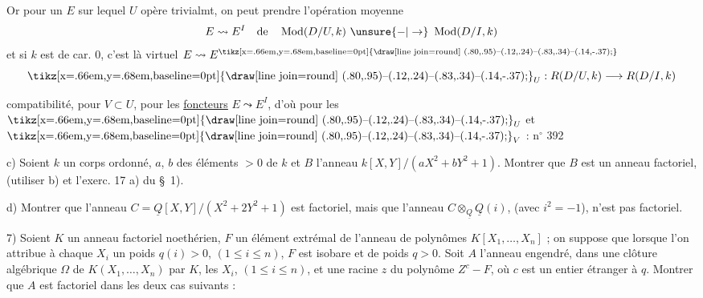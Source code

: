 Or pour un $E$ sur lequel $U$ opère trivialmt, on peut prendre l'opération moyenne
\[
 E\leadsto E^I \quad \text{de}\quad \operatorname{Mod}(D/U,k)\ \unsure{\mathord{-}|\to}\ \operatorname{Mod}(D/I,k)
\]
et si $k$ est de car. $0$, c'est là     virtuel  $E\leadsto E^{\mathord{\text{\tikz[x=.66em,y=.68em,baseline=0pt]{\draw[line join=round] (.80,.95)--(.12,.24)--(.83,.34)--(.14,-.37);}}}}$
\[
 \mathord{\text{\tikz[x=.66em,y=.68em,baseline=0pt]{\draw[line join=round] (.80,.95)--(.12,.24)--(.83,.34)--(.14,-.37);}}}_U:R(D/U,k)\longrightarrow R(D/I,k)
\]

  compatibilité, pour $V\subset U$, pour les \uline{foncteurs} $E\leadsto E^I$, d'où pour les $\mathord{\text{\tikz[x=.66em,y=.68em,baseline=0pt]{\draw[line join=round] (.80,.95)--(.12,.24)--(.83,.34)--(.14,-.37);}}}_U$ et $\mathord{\text{\tikz[x=.66em,y=.68em,baseline=0pt]{\draw[line join=round] (.80,.95)--(.12,.24)--(.83,.34)--(.14,-.37);}}}_V$ :
\hfill n$^{\circ}$ 392

c) Soient $k$ un corps ordonné, $a$, $b$ des éléments $>0$ de $k$ et $B$ l'anneau $k[X,Y]/(aX^2+bY^2+1)$. Montrer que $B$ est un anneau factoriel, (utiliser b) et l'exerc. 17 a) du \S~1).

d) Montrer que l'anneau $C=\underline{Q}[X,Y]/(X^2+2Y^2+1)$ est factoriel, mais que l'anneau $C\otimes_{\underline{Q}}\underline{Q}(i)$, (avec $i^2=-1$), n'est pas factoriel.

7) Soient $K$ un anneau factoriel noethérien, $F$ un élément extrémal de l'anneau de polynômes $K[X_1,\ldots,X_n]$ ; on suppose que lorsque l'on attribue à chaque $X_i$ un poids $q(i)>0$, $(1\leq i\leq n)$, $F$ est isobare et de poids $q>0$. Soit $A$ l'anneau engendré, dans une clôture algébrique $\Omega$ de $K(X_1,\ldots,X_n)$ par $K$, les $X_i$, $(1\leq i\leq n)$, et une racine $z$ du polynôme $Z^c-F$, où $c$ est un entier étranger à $q$. Montrer que $A$ est factoriel dans les deux cas suivants :

